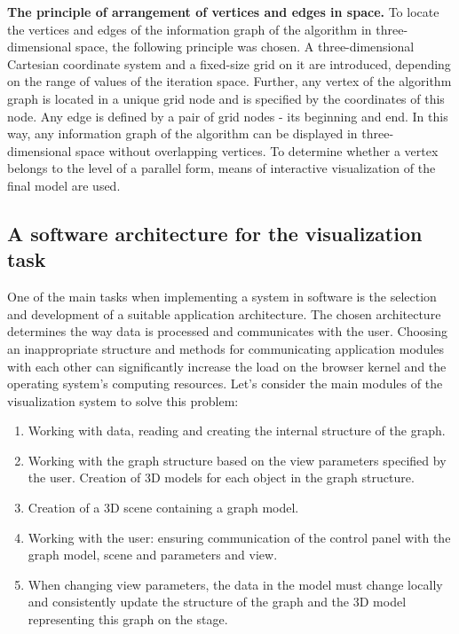 \textbf{The principle of arrangement of vertices and edges in space.} To locate the vertices and edges of the information graph of the algorithm in three-dimensional space, the following principle was chosen. A three-dimensional Cartesian coordinate system and a fixed-size grid on it are introduced, depending on the range of values of the iteration space. Further, any vertex of the algorithm graph is located in a unique grid node and is specified by the coordinates of this node. Any edge is defined by a pair of grid nodes - its beginning and end. In this way, any information graph of the algorithm can be displayed in three-dimensional space without overlapping vertices. To determine whether a vertex belongs to the level of a parallel form, means of interactive visualization of the final model are used.

\subsection{A software architecture for the visualization task}

One of the main tasks when implementing a system in software is the selection and development of a suitable application architecture. The chosen architecture determines the way data is processed and communicates with the user. Choosing an inappropriate structure and methods for communicating application modules with each other can significantly increase the load on the browser kernel and the operating system's computing resources. Let's consider the main modules of the visualization system to solve this problem:


\begin{enumerate}
    \item Working with data, reading and creating the internal structure of the graph.
    \item Working with the graph structure based on the view parameters specified by the user. Creation of 3D models for each object in the graph structure.
    \item Creation of a 3D scene containing a graph model.
    \item Working with the user: ensuring communication of the control panel with the graph model, scene and parameters and view.
    \item When changing view parameters, the data in the model must change locally and consistently update the structure of the graph and the 3D model representing this graph on the stage.
\end{enumerate}

